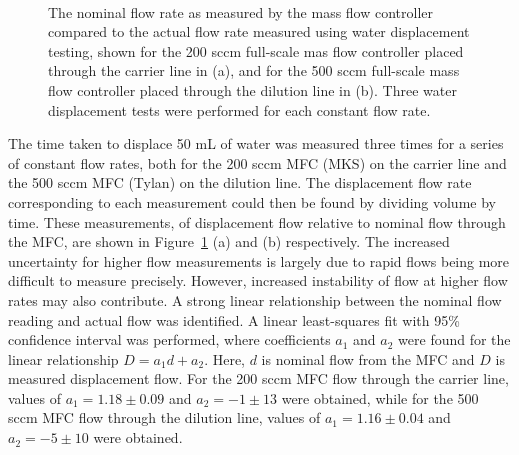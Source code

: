 \documentclass[
  a4paper,
]{scrbook}
\begin{document}
\begin{figure}
\begin{minipage}[t]{0.45\linewidth}
{{}

}

\end{minipage}%
%
\begin{minipage}[t]{0.01\linewidth}

{\centering 

~

}

\end{minipage}%

\caption[Calibration curves showing the nominal flow rate as measured by
the mass flow controller compared to the actual flow rate measured using
water displacement testing.]{\label{fig-MFC-calibration-curves}The
nominal flow rate as measured by the mass flow controller compared to
the actual flow rate measured using water displacement testing, shown
for the 200 sccm full-scale mas flow controller placed through the
carrier line in (a), and for the 500 sccm full-scale mass flow
controller placed through the dilution line in (b). Three water
displacement tests were performed for each constant flow rate.}

\end{figure}

The time taken to displace 50 mL of water was measured three times for a
series of constant flow rates, both for the 200 sccm MFC (MKS) on the
carrier line and the 500 sccm MFC (Tylan) on the dilution line. The
displacement flow rate corresponding to each measurement could then be
found by dividing volume by time. These measurements, of displacement
flow relative to nominal flow through the MFC, are shown in
Figure~\ref{fig-MFC-calibration-curves} (a) and (b) respectively. The
increased uncertainty for higher flow measurements is largely due to
rapid flows being more difficult to measure precisely. However,
increased instability of flow at higher flow rates may also contribute.
A strong linear relationship between the nominal flow reading and actual
flow was identified. A linear least-squares fit with 95\% confidence
interval was performed, where coefficients \(a_1\) and \(a_2\) were
found for the linear relationship \(D = a_1d + a_2\). Here, \(d\) is
nominal flow from the MFC and \(D\) is measured displacement flow. For
the 200 sccm MFC flow through the carrier line, values of
\(a_1 = 1.18\pm0.09\) and \(a_2 = -1\pm13\) were obtained, while for the
500 sccm MFC flow through the dilution line, values of
\(a_1 = 1.16\pm0.04\) and \(a_2 = -5\pm10\) were obtained.
\end{document}
